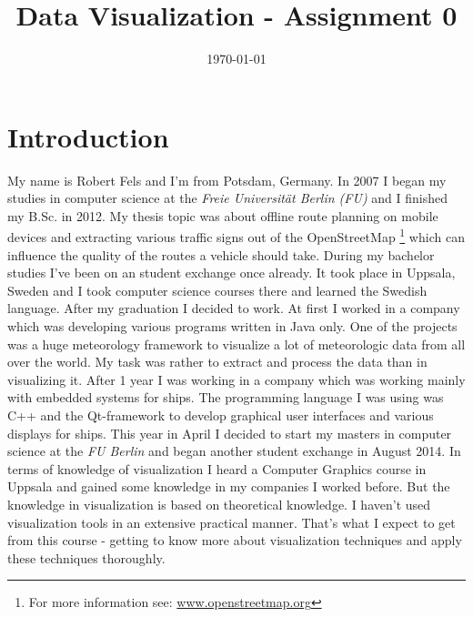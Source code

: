 \documentclass[a4paper,10pt]{scrartcl}
\title{Data Visualization  - Assignment 0}
\author{\Authors}
\date{\today}
\begin{document}
\maketitle

\section{Introduction}
My name is Robert Fels and I'm from Potsdam, Germany. In 2007 I began my studies in computer science at the \textit{Freie Universität Berlin (FU) } and I finished my B.Sc. in 2012. My thesis topic was about offline route planning on mobile devices and extracting various traffic signs out of the OpenStreetMap \footnote{For more information see: \url{www.openstreetmap.org} } which can influence the quality of the routes a vehicle should take. During my bachelor studies I've been on an student exchange once already. It took place in Uppsala, Sweden and I took computer science courses there and learned the Swedish language. After my graduation I decided to work. At first I worked in a company which was developing various programs written in Java only. One of the projects was a huge meteorology framework to visualize a lot of meteorologic data from all over the world. My task was rather to extract and process the data than in visualizing it. After 1 year I was working in a company which was working mainly with embedded systems for ships. The programming language I was using was C++ and the Qt-framework to develop graphical user interfaces and various displays for ships. This year in April I decided to start my masters in computer science at the \textit{FU Berlin} and began another student exchange in August 2014. In terms of knowledge of visualization I heard a Computer Graphics course in Uppsala and gained some knowledge in my companies I worked before. But the knowledge in visualization is based on theoretical knowledge. I haven't used visualization tools in an extensive practical manner. That's what I expect to get from this course - getting to know more about visualization techniques and apply these techniques thoroughly. 
\end{document}
